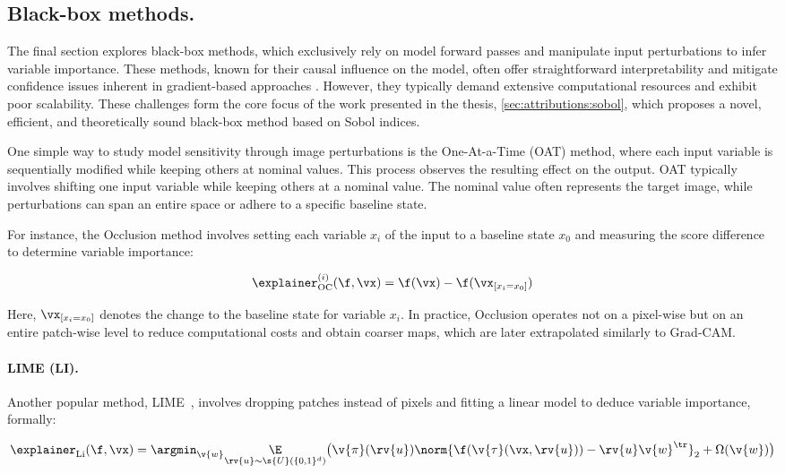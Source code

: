 \subsection{Black-box methods.}

The final section explores black-box methods, which exclusively rely on model forward passes and manipulate input perturbations to infer variable importance. These methods, known for their causal influence on the model, often offer straightforward interpretability and mitigate confidence issues inherent in gradient-based approaches \cite{adebayo2018sanity,ghorbani2017interpretation,sixt2020explanations}. However, they typically demand extensive computational resources and exhibit poor scalability. These challenges form the core focus of the work presented in the thesis, \autoref{sec:attributions:sobol}, which proposes a novel, efficient, and theoretically sound black-box method based on Sobol indices.

One simple way to study model sensitivity through image perturbations is the One-At-a-Time (OAT) method, where each input variable is sequentially modified while keeping others at nominal values. This process observes the resulting effect on the output. OAT typically involves shifting one input variable while keeping others at a nominal value. The nominal value often represents the target image, while perturbations can span an entire space or adhere to a specific baseline state.

For instance, the Occlusion method involves setting each variable $x_i$ of the input to a baseline state $x_0$ and measuring the score difference to determine variable importance:

$$
\explainer_{\text{OC}}^{(i)}(\f, \vx) = \f(\vx) - \f(\vx_{[x_i = x_0]})
$$

Here, $\vx_{[x_i = x_0]}$ denotes the change to the baseline state for variable $x_i$. In practice, Occlusion operates not on a pixel-wise but on an entire patch-wise level to reduce computational costs and obtain coarser maps, which are later extrapolated similarly to Grad-CAM.

\paragraph{LIME (LI).} Another popular method, LIME~\cite{ribeiro2016lime}, involves dropping patches instead of pixels and fitting a linear model to deduce variable importance, formally:

$$
\explainer_{\text{Li}}(\f, \vx) = \argmin_{\v{w}} 
    \underset{\rv{u} \sim \s{U}(\{0,1\}^d)}{\E} 
        \big( \v{\pi}(\rv{u}) \norm{\f(\v{\tau}(\vx, \rv{u})) - \rv{u} \v{w}^\tr }_2 + \Omega(\v{w}) \big)
$$

